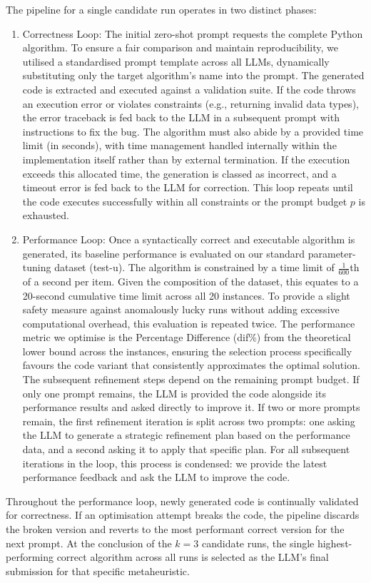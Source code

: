 \documentclass[11pt]{article}
\begin{document}
The pipeline for a single candidate run operates in two distinct phases:
\begin{enumerate}
    \item Correctness Loop: The initial zero-shot prompt requests the 
    complete Python algorithm. To ensure a fair comparison and maintain reproducibility, we utilised a standardised prompt template across all LLMs, dynamically substituting only the target algorithm's name into the prompt. The generated code is extracted and executed 
    against a validation suite. If the code throws an execution error or 
    violates constraints (e.g., returning invalid data types), the error 
    traceback is fed back to the LLM in a subsequent prompt with 
    instructions to fix the bug. The algorithm must also abide by a provided time limit (in seconds), with time management handled internally within the implementation itself rather than by external termination. If the execution exceeds this allocated time, the generation is classed as incorrect, and a timeout error is fed back to the LLM for correction. This loop repeats until the code executes successfully within all constraints or the prompt budget $p$ is exhausted.
    \item Performance Loop: Once a syntactically correct and executable 
    algorithm is generated, its baseline performance is evaluated on our 
    standard parameter-tuning dataset (test-u). The algorithm is 
    constrained by a time limit of $\frac{1}{600}$th of a second per item. 
    Given the composition of the dataset, this equates to a 20-second 
    cumulative time limit across all 20 instances. To provide a slight 
    safety measure against anomalously lucky runs without adding excessive 
    computational overhead, this evaluation is repeated twice. The 
    performance metric we optimise is the Percentage Difference (dif\%) 
    from the theoretical lower bound across the instances, ensuring the 
    selection process specifically favours the code variant that 
    consistently approximates the optimal solution. The subsequent 
    refinement steps depend on the remaining prompt budget. If only one 
    prompt remains, the LLM is provided the code alongside its performance 
    results and asked directly to improve it. If two or more prompts 
    remain, the first refinement iteration is split across two prompts: 
    one asking the LLM to generate a strategic refinement plan based on 
    the performance data, and a second asking it to apply that specific 
    plan. For all subsequent iterations in the loop, this process is 
    condensed: we provide the latest performance feedback and ask the LLM 
    to improve the code.
\end{enumerate}
Throughout the performance loop, newly generated code is continually 
validated for correctness. If an optimisation attempt breaks the code, 
the pipeline discards the broken version and reverts to the most 
performant correct version for the next prompt. At the conclusion of the 
$k = 3$ candidate runs, the single highest-performing correct algorithm 
across all runs is selected as the LLM's final submission for that 
specific metaheuristic.
\end{document}
